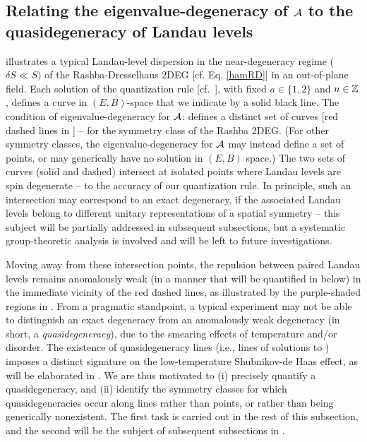 \documentclass[aps, showpacs, twocolumn, notitlepage, superscriptaddress]{revtex4-1}
\begin{document}
\subsection{Relating the eigenvalue-degeneracy of ${\cal A}$ to the quasidegeneracy of Landau levels}\label{sec:relatedegeneracies}


 illustrates a typical Landau-level dispersion in the near-degeneracy regime ($\delta S{\ll} S)$ of the Rashba-Dresselhaus 2DEG [cf. Eq. \ref{hamRD}] in an out-of-plane field. Each solution of the quantization rule [cf.\ ], with fixed $a\in \{1,2\}$ and $n \in \mathbb{Z}$, defines a curve in $(E,B)$-space that we indicate by  a solid black line. The condition of eigenvalue-degeneracy for ${\cal A}$:  
defines a distinct set of curves [red dashed lines in ] -- for the symmetry class of the Rashba 2DEG. (For other symmetry classes, the eigenvalue-degeneracy for ${\cal A}$ may instead define a set of points, or may generically have no solution in $(E,B)$ space.)   The two sets of curves (solid and dashed) intersect at isolated points where Landau levels are spin degenerate -- to the accuracy of our quantization rule. In principle, such an intersection may correspond to an exact  degeneracy, if the associated Landau levels belong to different unitary representations of a spatial symmetry -- this subject will be partially addressed in subsequent subsections, but a systematic group-theoretic analysis is involved and will be left to future investigations.

Moving away from these intersection points, the repulsion between paired Landau levels  remains anomalously weak (in a manner that will be quantified in  below) in the immediate vicinity of the red dashed lines, as illustrated by the purple-shaded regions in .  From a pragmatic standpoint, a typical experiment may not be able to distinguish an exact degeneracy from an anomalously weak degeneracy (in short, a \textit{quasidegeneracy}), due to the smearing effects of temperature and/or disorder\cite{shoenberg_magnetic_2009}. The existence of  quasidegeneracy lines (i.e., lines of solutions to ) imposes a distinct signature on the low-temperature Shubnikov-de Haas effect, as will be elaborated in .  We are thus motivated to (i) precisely quantify a quasidegeneracy, and (ii) identify the symmetry classes for which quasidegeneracies occur along lines rather than points, or rather than being generically nonexistent. The first task is carried out in the rest of this subsection, and the second will be the subject of subsequent subsections in . 
\end{document}
